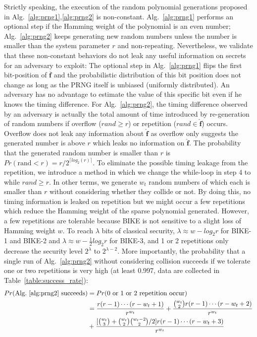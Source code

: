 \documentclass[runningheads]{llncs}
\begin{document}
Strictly speaking, the execution of the random polynomial generations proposed in Alg.~\ref{alg:prng1},\ref{alg:prng2} is non-constant. Alg.~\ref{alg:prng1} performs an optional step if the Hamming weight of the polynomial is an even number; Alg.~\ref{alg:prng2} keeps generating new random numbers unless the number is smaller than the system parameter $r$ and non-repeating. Nevertheless, we validate that these non-constant behaviors do not leak any useful information on secrets for an adversary to exploit: The optional step in Alg.~\ref{alg:prng1} flips the first bit-position of $\mathbf{\overline{f}}$ and the probabilistic distribution of this bit position does not change as long as the PRNG itself is unbiased (uniformly distributed). An adversary has no advantage to estimate the value of this specific bit even if he knows the timing difference. For Alg.~\ref{alg:prng2}, the timing difference observed by an adversary is actually the total amount of time introduced by re-generation of random numbers if overflow ($rand\geq r$) or repetition ($rand\in \mathbf{\hat{f}}$) occurs. Overflow does not leak any information about $\mathbf{\hat{f}}$ as overflow only suggests the generated number is above $r$ which leaks no information on $\mathbf{\hat{f}}$. The probability that the generated random number is smaller than $r$ is $Pr(\text{rand} < r)= r/2^{\lceil log_2(r)\rceil}$. To eliminate the possible timing leakage from the repetition, we introduce a method in which we change the while-loop in step 4 to while $rand\geq r$. In other terms, we generate $w_t$ random numbers of which each is smaller than $r$ without considering whether they collide or not. By doing this, no timing information is leaked on repetition but we might occur a few repetitions which reduce the Hamming weight of the sparse polynomial generated. However, a few repetitions are tolerable because BIKE is not sensitive to a slight loss of Hamming weight $w$. To reach $\lambda$ bits of classical security, $\lambda\approx w-log_2r$ for BIKE-1 and BIKE-2 and $\lambda\approx w-\frac{1}{2}log_2r$ for BIKE-3, and 1 or 2 repetitions only decrease the security level $2^\lambda$ to $2^{\lambda-2}$.
More importantly, the probability that a single run of Alg.~\ref{alg:prng2} without considering collision succeeds if we tolerate one or two repetitions is very high (at least 0.997, data are collected in Table~\ref{table:success_rate}):
\begin{align}
    Pr(\text{Alg.~\ref{alg:prng2} succeeds}) &= Pr(\text{0 or 1 or 2 repetition occur})\\
    &=\frac{r(r-1)\cdots (r-w_t+1)}{r^{w_t}}+ \frac{\binom{w_t}{2}r(r-1)\cdots (r-w_t+2)}{r^{w_t}}\\
    &+ \frac{[\binom{w_t}{3}+\binom{w_t}{2}\binom{w_t-2}{2}/2]  r(r-1)\cdots (r-w_t+3) }{r^{w_t}}
\end{align}
\end{document}
